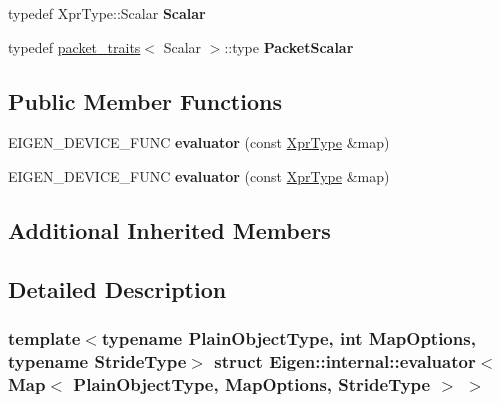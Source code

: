 \begin{DoxyCompactItemize}
typedef Xpr\+Type\+::\+Scalar {\bfseries Scalar}
\item 
\mbox{\label{struct_eigen_1_1internal_1_1evaluator_3_01_map_3_01_plain_object_type_00_01_map_options_00_01_stride_type_01_4_01_4_a005617b21f80a25250a573052bd35319}} 
typedef \hyperlink{struct_eigen_1_1internal_1_1packet__traits}{packet\+\_\+traits}$<$ Scalar $>$\+::type {\bfseries Packet\+Scalar}
\end{DoxyCompactItemize}
\subsection*{Public Member Functions}
\begin{DoxyCompactItemize}
\item 
\mbox{\label{struct_eigen_1_1internal_1_1evaluator_3_01_map_3_01_plain_object_type_00_01_map_options_00_01_stride_type_01_4_01_4_a0a8ec07dfd1229d9e45bb3178ffc378c}} 
E\+I\+G\+E\+N\+\_\+\+D\+E\+V\+I\+C\+E\+\_\+\+F\+U\+NC {\bfseries evaluator} (const \hyperlink{group___core___module_class_eigen_1_1_map}{Xpr\+Type} \&map)
\item 
\mbox{\label{struct_eigen_1_1internal_1_1evaluator_3_01_map_3_01_plain_object_type_00_01_map_options_00_01_stride_type_01_4_01_4_a0a8ec07dfd1229d9e45bb3178ffc378c}} 
E\+I\+G\+E\+N\+\_\+\+D\+E\+V\+I\+C\+E\+\_\+\+F\+U\+NC {\bfseries evaluator} (const \hyperlink{group___core___module_class_eigen_1_1_map}{Xpr\+Type} \&map)
\end{DoxyCompactItemize}
\subsection*{Additional Inherited Members}


\subsection{Detailed Description}
\subsubsection*{template$<$typename Plain\+Object\+Type, int Map\+Options, typename Stride\+Type$>$\newline
struct Eigen\+::internal\+::evaluator$<$ Map$<$ Plain\+Object\+Type, Map\+Options, Stride\+Type $>$ $>$}



